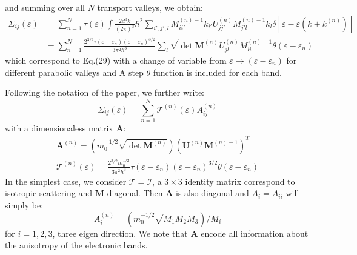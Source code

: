 \documentclass{article}
\begin{document}
and summing over all $N$ transport valleys, we obtain:
\begin{align}
    \Sigma_{ij} (\varepsilon) & = \sum_{n=1}^N \tau(\varepsilon)
        \int \frac{2d^3k}{(2\pi)^3} \hbar^2 
        \sum_{i',j',l} M_{ii'}^{(n)-1} k_{i'} U_{jj'}^{(n)} M_{j'l}^{(n)-1} k_l 
        \delta[\varepsilon - \varepsilon(k + k^{(n)})] \\
        & = \sum_{n=1}^N  \frac{2^{3/2} \tau(\varepsilon - \varepsilon_n) (\varepsilon - \varepsilon_n)^{3/2} }{3\pi^2\hbar^3}
        \sum_l \sqrt{\det \mathbf{M}^{(n)}} U_{jl}^{(n)} M_{li}^{(n)-1} \theta(\varepsilon - \varepsilon_n)
\end{align}
which correspond to Eq.(29) with a change of variable from $\varepsilon \to (\varepsilon - \varepsilon_n)$ 
for different parabolic valleys and A step $\theta$ function is included for each band. 

Following the notation of the paper, we further write:
\begin{equation}
    \Sigma_{ij} (\varepsilon) = \sum_{n=1}^N \mathcal{T}^{(n)}(\varepsilon) A_{ij}^{(n)}
\end{equation}
with a dimensionaless matrix $\mathbf{A}$:
\begin{gather}
    \mathbf{A}^{(n)} = \left( m_0^{-1/2} \sqrt{\det \mathbf{M}^{(n)}} \right) 
        \left( \mathbf{U}^{(n)} \mathbf{M}^{(n)-1} \right)^T \\
    \mathcal{T}^{(n)}(\varepsilon) = \frac{2^{3/2} m_0^{1/2}}{3\pi^2\hbar^3}
    \tau(\varepsilon - \varepsilon_n) (\varepsilon - \varepsilon_n)^{3/2} \theta(\varepsilon - \varepsilon_n)
\end{gather}
In the simplest case, we consider $\mathcal{T} = \mathcal{I}$, a $3\times 3$ identity matrix
correspond to isotropic scattering
and $\mathbf{M}$ diagonal. Then $\mathbf{A}$ is also diagonal and
 $A_{i} = A_{ii}$ will simply be:
\begin{equation}
    A^{(n)}_{i} = \left( m_0^{-1/2} \sqrt{M_1 M_2 M_3} \right) / M_i
\end{equation}
for $i = 1,2,3$, three eigen direction. We note that $\mathbf{A}$ encode all information 
about the anisotropy of the electronic bands.
\end{document}
